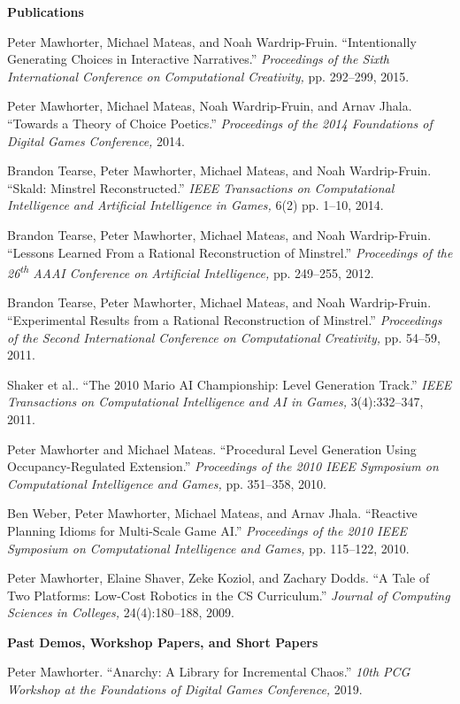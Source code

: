 \documentclass[11pt]{article}
\newenvironment{pubs}[1]{%
  \vspace{8pt}\textbf{\Large #1} \hrulefill\vspace{6pt}
  \begin{adjustwidth}{14pt}{0pt}
  \setlength{\parskip}{4pt}
  \setlength{\parindent}{-8pt}
}{%
  \end{adjustwidth}
}
\newcommand{\fullpub}[5]{%
\begin{samepage}
#1. ``#2.'' \textit{#3,} #4, #5.

\end{samepage}%
}
\newcommand{\nppub}[4]{%
\begin{samepage}
#1. ``#2.'' \textit{#3,} #4.

\end{samepage}%
}
\newcommand{\heading}[1]{\textbf{\large #1}\vspace{4pt}}
\newcommand{\tsup}[1]{\textsuperscript{#1}}
\begin{document}
\begin{pubs}{Publications}
\fullpub{Peter Mawhorter, Michael Mateas, and Noah Wardrip-Fruin}{Intentionally Generating Choices in Interactive Narratives}{Proceedings of the Sixth International Conference on Computational Creativity}{pp. 292--299}{2015}

\nppub{Peter Mawhorter, Michael Mateas, Noah Wardrip-Fruin, and Arnav Jhala}{Towards a Theory of Choice Poetics}{Proceedings of the 2014 Foundations of Digital Games Conference}{2014}

\fullpub{Brandon Tearse, Peter Mawhorter, Michael Mateas, and Noah Wardrip-Fruin}{Skald: Minstrel Reconstructed}{IEEE Transactions on Computational Intelligence and Artificial Intelligence in Games}{6(2) pp. 1--10}{2014}

\fullpub{Brandon Tearse, Peter Mawhorter, Michael Mateas, and Noah Wardrip-Fruin}{Lessons Learned From a Rational Reconstruction of Minstrel}{Proceedings of the 26\tsup{th} AAAI Conference on Artificial Intelligence}{pp. 249--255}{2012}

\fullpub{Brandon Tearse, Peter Mawhorter, Michael Mateas, and Noah Wardrip-Fruin}{Experimental Results from a Rational Reconstruction of Minstrel}{Proceedings of the Second International Conference on Computational Creativity}{pp. 54--59}{2011}

\fullpub{Shaker et al.}{The 2010 Mario AI Championship: Level Generation Track}{IEEE Transactions on Computational Intelligence and AI in Games}{3(4):332--347}{2011}

\fullpub{Peter Mawhorter and Michael Mateas}{Procedural Level Generation Using Occupancy-Regulated Extension}{Proceedings of the 2010 IEEE Symposium on Computational Intelligence and Games}{pp. 351--358}{2010}

\fullpub{Ben Weber, Peter Mawhorter, Michael Mateas, and Arnav Jhala}{Reactive Planning Idioms for Multi-Scale Game AI}{Proceedings of the 2010 IEEE Symposium on Computational Intelligence and Games}{pp. 115--122}{2010}

\fullpub{Peter Mawhorter, Elaine Shaver, Zeke Koziol, and Zachary Dodds}{A Tale of Two Platforms: Low-Cost Robotics in the CS Curriculum}{Journal of Computing Sciences in Colleges}{24(4):180--188}{2009}

\vspace{6pt}
\heading{Past Demos, Workshop Papers, and Short Papers}

\nppub{Peter Mawhorter}{Anarchy: A Library for Incremental Chaos}{10th PCG Workshop at the Foundations of Digital Games Conference}{2019}


\end{pubs}
\end{document}
